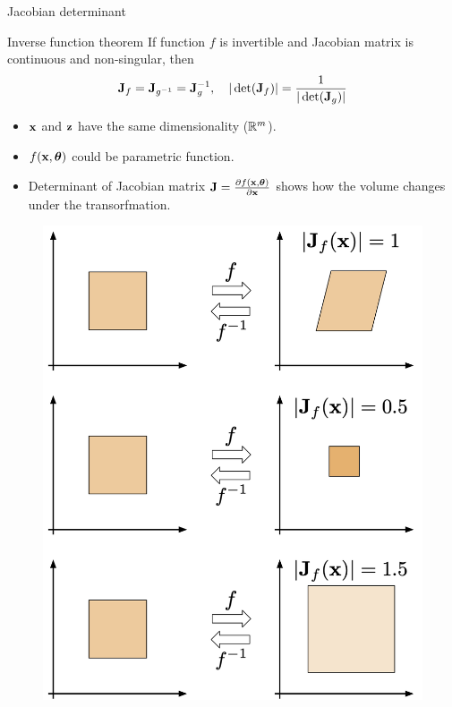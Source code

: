 \begin{frame}{Jacobian determinant}
	\begin{block}{Inverse function theorem}
		If function $f$ is invertible and Jacobian matrix is continuous and non-singular, then
		\vspace{-0.3cm}
		\[
		\mathbf{J}_f = \mathbf{J}_{g^{-1}} = \mathbf{J}_g^{-1}, \quad |\det (\mathbf{J}_f)| = \frac{1}{|\det (\mathbf{J}_g)|}
		\]
		\vspace{-0.3cm}
	\end{block}
	\begin{minipage}{0.55\columnwidth}
		\begin{itemize}
			\item $\mathbf{x}$ and $\mathbf{z}$ have the same dimensionality ($\mathbb{R}^m$).
			\vfill
			\item $f(\mathbf{x}, \boldsymbol{\theta})$ could be parametric function.
			\vfill
			\item Determinant  of Jacobian matrix $\mathbf{J} =\frac{\partial f(\mathbf{x}, \boldsymbol{\theta})}{\partial \mathbf{x}}$ shows how the volume changes under the transorfmation.
		\end{itemize}
	\end{minipage}%
	\begin{minipage}{0.45\columnwidth}
		\begin{figure}
			\includegraphics[width=0.8\linewidth]{figs/jacobian_det}
		\end{figure}
	\end{minipage}
\end{frame}
